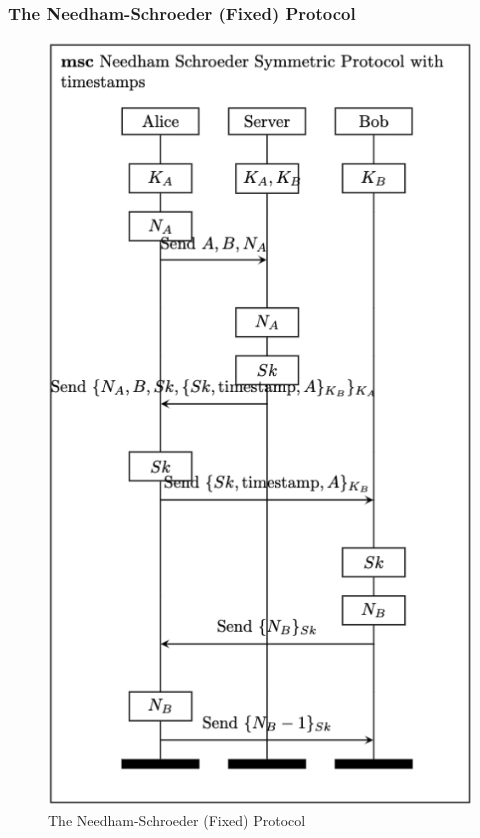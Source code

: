 \documentclass[aspectratio=169,t,xcolor=table]{beamer}
\begin{document}
\begin{frame}
    \frametitle{The Needham-Schroeder (Fixed) Protocol}
    \begin{figure}
        \centering
        \includegraphics[width=.26\textwidth]{images/NS_fixed.png}
        \caption{The Needham-Schroeder (Fixed) Protocol}
    \end{figure}
\end{frame}
\end{document}

